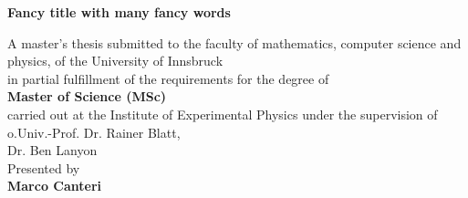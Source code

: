 
\begin{titlepage}


 \thispagestyle{frontpage}

 \begin{center}

   \vspace*{6\baselineskip}


   {\Huge \textbf{Fancy title with many fancy words\\}}

   

       \vspace*{1,5\baselineskip}


   \vspace{1,5\baselineskip}

   \large{A master’s thesis submitted to the faculty of mathematics, computer science and physics, of the University of Innsbruck\\ in partial fulfillment of the requirements for the degree of\\\vspace{1,2\baselineskip}\textbf{Master of Science (MSc)} \\\vspace{1,2\baselineskip}carried out at the Institute of Experimental Physics under the supervision of}\\
   \large{o.Univ.-Prof.  Dr.  Rainer Blatt,}\\
   \large{Dr. Ben Lanyon}\\
    \vspace{1,2\baselineskip}
   \large{Presented by\\}
   \huge{\textbf{Marco Canteri}}\\
   

 \end{center}

\end{titlepage}
